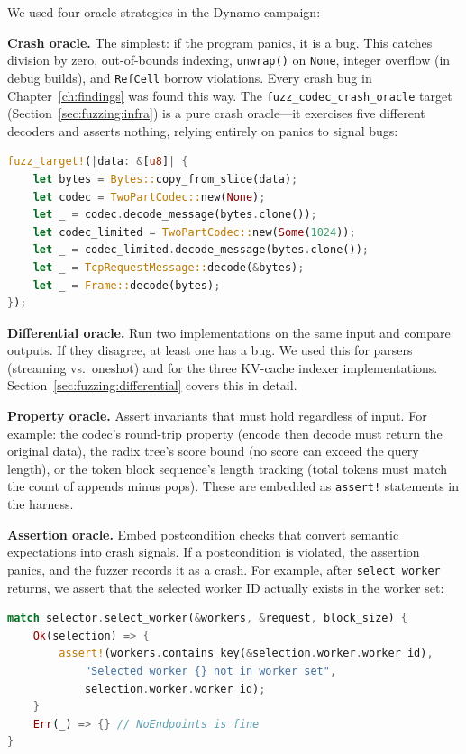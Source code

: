 We used four oracle strategies in the Dynamo campaign:

\textbf{Crash oracle.} The simplest: if the program panics, it is a bug. This catches division by zero, out-of-bounds indexing, \texttt{unwrap()} on \texttt{None}, integer overflow (in debug builds), and \texttt{RefCell} borrow violations. Every crash bug in Chapter~\ref{ch:findings} was found this way. The \texttt{fuzz\_codec\_crash\_oracle} target (Section~\ref{sec:fuzzing:infra}) is a pure crash oracle---it exercises five different decoders and asserts nothing, relying entirely on panics to signal bugs:

\begin{lstlisting}[language=Rust,caption={Crash oracle: the harness asserts nothing; any panic is a bug.}]
fuzz_target!(|data: &[u8]| {
    let bytes = Bytes::copy_from_slice(data);
    let codec = TwoPartCodec::new(None);
    let _ = codec.decode_message(bytes.clone());
    let codec_limited = TwoPartCodec::new(Some(1024));
    let _ = codec_limited.decode_message(bytes.clone());
    let _ = TcpRequestMessage::decode(&bytes);
    let _ = Frame::decode(bytes);
});
\end{lstlisting}

\textbf{Differential oracle.} Run two implementations on the same input and compare outputs. If they disagree, at least one has a bug. We used this for parsers (streaming vs.\ oneshot) and for the three KV-cache indexer implementations. Section~\ref{sec:fuzzing:differential} covers this in detail.

\textbf{Property oracle.} Assert invariants that must hold regardless of input. For example: the codec's round-trip property (encode then decode must return the original data), the radix tree's score bound (no score can exceed the query length), or the token block sequence's length tracking (total tokens must match the count of appends minus pops). These are embedded as \texttt{assert!} statements in the harness.

\textbf{Assertion oracle.} Embed postcondition checks that convert semantic expectations into crash signals. If a postcondition is violated, the assertion panics, and the fuzzer records it as a crash. For example, after \texttt{select\_worker} returns, we assert that the selected worker ID actually exists in the worker set:

\begin{lstlisting}[language=Rust,caption={Assertion oracle: postcondition check on worker selection.}]
match selector.select_worker(&workers, &request, block_size) {
    Ok(selection) => {
        assert!(workers.contains_key(&selection.worker.worker_id),
            "Selected worker {} not in worker set",
            selection.worker.worker_id);
    }
    Err(_) => {} // NoEndpoints is fine
}
\end{lstlisting}

